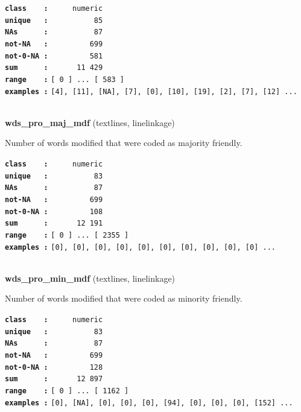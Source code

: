 \documentclass[]{article}
\begin{document}
\textbf{\texttt{class\ \ \ \ :}} \texttt{~~~~~numeric}\\
\textbf{\texttt{unique\ \ \ :}} \texttt{~~~~~~~~~~85}\\
\textbf{\texttt{NAs\ \ \ \ \ \ :}} \texttt{~~~~~~~~~~87}\\
\textbf{\texttt{not-NA\ \ \ :}} \texttt{~~~~~~~~~699}\\
\textbf{\texttt{not-0-NA\ :}} \texttt{~~~~~~~~~581}\\
\textbf{\texttt{sum\ \ \ \ \ \ :}} \texttt{~~~~~~11~429}\\
\textbf{\texttt{range\ \ \ \ :}}
\texttt{{[}\ 0\ {]}\ ...\ {[}\ 583\ {]}}\\
\textbf{\texttt{examples\ :}}
\texttt{{[}4{]},\ {[}11{]},\ {[}NA{]},\ {[}7{]},\ {[}0{]},\ {[}10{]},\ {[}19{]},\ {[}2{]},\ {[}7{]},\ {[}12{]}\ ...}\\

~

\textbf{wds\_pro\_maj\_mdf} (textlines, linelinkage)

Number of words modified that were coded as majority friendly.

\textbf{\texttt{class\ \ \ \ :}} \texttt{~~~~~numeric}\\
\textbf{\texttt{unique\ \ \ :}} \texttt{~~~~~~~~~~83}\\
\textbf{\texttt{NAs\ \ \ \ \ \ :}} \texttt{~~~~~~~~~~87}\\
\textbf{\texttt{not-NA\ \ \ :}} \texttt{~~~~~~~~~699}\\
\textbf{\texttt{not-0-NA\ :}} \texttt{~~~~~~~~~108}\\
\textbf{\texttt{sum\ \ \ \ \ \ :}} \texttt{~~~~~~12~191}\\
\textbf{\texttt{range\ \ \ \ :}}
\texttt{{[}\ 0\ {]}\ ...\ {[}\ 2355\ {]}}\\
\textbf{\texttt{examples\ :}}
\texttt{{[}0{]},\ {[}0{]},\ {[}0{]},\ {[}0{]},\ {[}0{]},\ {[}0{]},\ {[}0{]},\ {[}0{]},\ {[}0{]},\ {[}0{]}\ ...}\\

~

\textbf{wds\_pro\_min\_mdf} (textlines, linelinkage)

Number of words modified that were coded as minority friendly.

\textbf{\texttt{class\ \ \ \ :}} \texttt{~~~~~numeric}\\
\textbf{\texttt{unique\ \ \ :}} \texttt{~~~~~~~~~~83}\\
\textbf{\texttt{NAs\ \ \ \ \ \ :}} \texttt{~~~~~~~~~~87}\\
\textbf{\texttt{not-NA\ \ \ :}} \texttt{~~~~~~~~~699}\\
\textbf{\texttt{not-0-NA\ :}} \texttt{~~~~~~~~~128}\\
\textbf{\texttt{sum\ \ \ \ \ \ :}} \texttt{~~~~~~12~897}\\
\textbf{\texttt{range\ \ \ \ :}}
\texttt{{[}\ 0\ {]}\ ...\ {[}\ 1162\ {]}}\\
\textbf{\texttt{examples\ :}}
\texttt{{[}0{]},\ {[}NA{]},\ {[}0{]},\ {[}0{]},\ {[}0{]},\ {[}94{]},\ {[}0{]},\ {[}0{]},\ {[}0{]},\ {[}152{]}\ ...}\\
\end{document}
